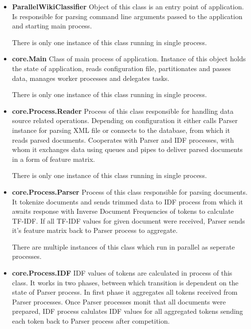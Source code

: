 \begin{itemize}
	\item \textbf{ParallelWikiClassifier}\newline
	Object of this class is an entry point of application. Is responsible for parsing command line arguments passed to the application and starting main process.
	
	There is only one instance of this class running in single process.
	
	\item \textbf{core.Main}\newline
	Class of main process of application. Instance of this object holds the state of application, reads configuration file, partitionates and passes data, manages worker processes and delegates tasks. 
	
	There is only one instance of this class running in single process.
	
	\item \textbf{core.Process.Reader}\newline
	Process of this class responsible for handling data source related operations. Depending on configuration it either calls Parser instance for parsing XML file or connects to the database, from which it reads parsed documents. Cooperates with Parser and IDF processes, with whom it exchanges data using queues and pipes to deliver parsed documents in a form of feature matrix.
	
	There is only one instance of this class running in single process.
	
	\item \textbf{core.Process.Parser}\newline
	Process of this class responsible for parsing documents. It tokenize documents and sends trimmed data to IDF process from which it awaits response with Inverse Document Frequencies of tokens to calculate TF-IDF. If all TF-IDF values for given document were received, Parser sends it's feature matrix back to Parser process to aggregate.
	
	There are multiple instances of this class which run in parallel as seperate processes.
	
	\item \textbf{core.Process.IDF}\newline
	IDF values of tokens are calculated in process of this class. It works in two phases, between which transition is dependent on the state of Parser process. In first phase it aggregates all tokens received from Parser processes. Once Parser processes monit that all documents were prepared, IDF process calulates IDF values for all aggregated tokens sending each token back to Parser process after competition.
	

\end{itemize}
